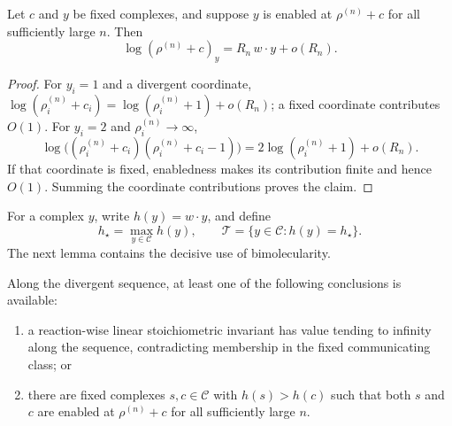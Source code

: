 \begin{lemma}\label{lem:ff-asymptotic}
Let \(c\) and \(y\) be fixed complexes, and suppose \(y\) is enabled at
\(\rho^{(n)}+c\) for all sufficiently large \(n\).  Then
\begin{equation}\label{eq:ff-asymptotic}
  \log(\rho^{(n)}+c)_y=R_n\,w\cdot y+o(R_n).
\end{equation}
\end{lemma}

\begin{proof}
For \(y_i=1\) and a divergent coordinate,
\(\log(\rho_i^{(n)}+c_i)=\log(\rho_i^{(n)}+1)+o(R_n)\); a fixed coordinate
contributes \(O(1)\).  For \(y_i=2\) and \(\rho_i^{(n)}\to\infty\),
\[
 \log\bigl((\rho_i^{(n)}+c_i)(\rho_i^{(n)}+c_i-1)\bigr)
 =2\log(\rho_i^{(n)}+1)+o(R_n).
\]
If that coordinate is fixed, enabledness makes its contribution finite and
hence \(O(1)\).  Summing the coordinate contributions proves the claim.
\end{proof}

For a complex \(y\), write \(h(y)=w\cdot y\), and define
\begin{equation}\label{eq:top}
  h_\star=\max_{y\in\mathcal C}h(y),
  \qquad
  \mathcal T=\{y\in\mathcal C:h(y)=h_\star\}.
\end{equation}
The next lemma contains the decisive use of bimolecularity.

\begin{lemma}\label{lem:top}
Along the divergent sequence, at least one of the following conclusions is
available:

\begin{enumerate}[label=\textup{(\roman*)},leftmargin=2.5em]
\item a reaction-wise linear stoichiometric invariant has value tending to
      infinity along the sequence, contradicting membership in the fixed
      communicating class; or
\item there are fixed complexes \(s,c\in\mathcal C\) with
      \(h(s)>h(c)\) such that both \(s\) and \(c\) are enabled at
      \(\rho^{(n)}+c\) for all sufficiently large \(n\).
\end{enumerate}
\end{lemma}

